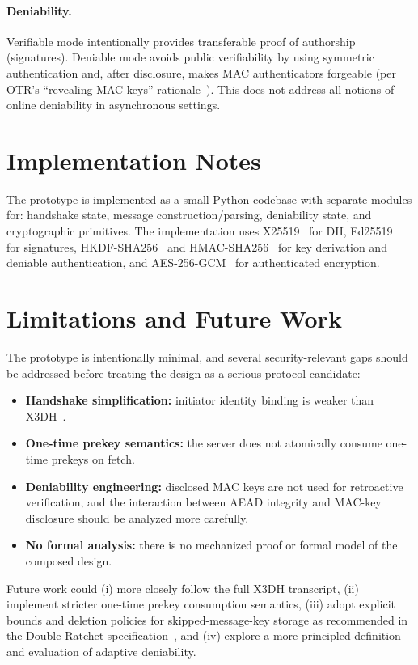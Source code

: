 \documentclass[11pt]{article}
\begin{document}
\paragraph{Deniability.}
Verifiable mode intentionally provides transferable proof of authorship (signatures).
Deniable mode avoids public verifiability by using symmetric authentication and, after disclosure, makes MAC authenticators forgeable (per OTR's ``revealing MAC keys'' rationale~\cite{otr_v3}).
This does not address all notions of online deniability in asynchronous settings.

\section{Implementation Notes}
The prototype is implemented as a small Python codebase with separate modules for:
handshake state, message construction/parsing, deniability state, and cryptographic primitives.
The implementation uses X25519~\cite{rfc7748} for DH, Ed25519~\cite{rfc8032} for signatures, HKDF-SHA256~\cite{rfc5869} and HMAC-SHA256~\cite{rfc2104} for key derivation and deniable authentication, and AES-256-GCM~\cite{nist_fips197,nist_sp800_38d} for authenticated encryption.

\section{Limitations and Future Work}
The prototype is intentionally minimal, and several security-relevant gaps should be addressed before treating the design as a serious protocol candidate:
\begin{itemize}
\item \textbf{Handshake simplification:} initiator identity binding is weaker than X3DH~\cite{signal_x3dh}.
\item \textbf{One-time prekey semantics:} the server does not atomically consume one-time prekeys on fetch.
\item \textbf{Deniability engineering:} disclosed MAC keys are not used for retroactive verification, and the interaction between AEAD integrity and MAC-key disclosure should be analyzed more carefully.
\item \textbf{No formal analysis:} there is no mechanized proof or formal model of the composed design.
\end{itemize}

Future work could (i) more closely follow the full X3DH transcript, (ii) implement stricter one-time prekey consumption semantics, (iii) adopt explicit bounds and deletion policies for skipped-message-key storage as recommended in the Double Ratchet specification~\cite{signal_doubleratchet}, and (iv) explore a more principled definition and evaluation of adaptive deniability.
\end{document}
